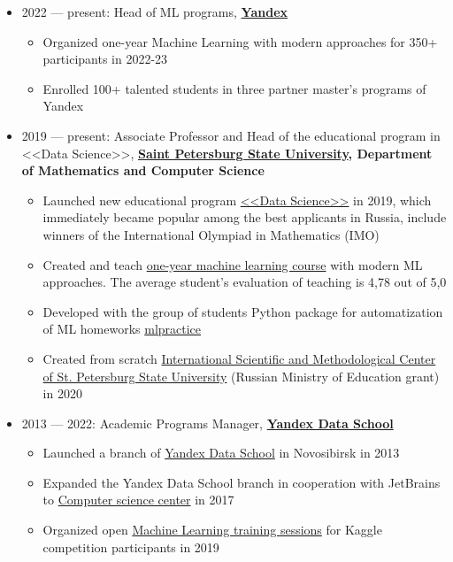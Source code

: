 \documentclass[11pt]{article}
\begin{document}
\begin{itemize}
	\item 2022 — present:
	Head of ML programs, \textbf{\href{https://yandex.ru}{Yandex}}
	\begin{itemize}
		\item Organized one-year Machine Learning with modern approaches for 350+ participants in 2022-23
		\item Enrolled 100+ talented students in three partner master's programs of Yandex 
	\end{itemize}

 \item 2019 — present:
 Associate Professor and Head of the educational program in <<Data Science>>,  \textbf{\href{https://spbu.ru}{Saint Petersburg State University}, Department of Mathematics and Computer Science}
 \begin{itemize}
	 \item Launched new educational program \href{https://maad.compscicenter.ru}{<<Data Science>>} in 2019, which immediately became popular among the best applicants in Russia, include winners of the International Olympiad in Mathematics (IMO)
	 \item Created and teach \href{https://github.com/spbu-math-cs/ml-course/}{one-year machine learning course} with modern ML approaches. The average student's evaluation of teaching is 4,78 out of 5,0
	 \item Developed with the group of students Python package for automatization of ML homeworks \href{https://github.com/avalur/mlpractice}{mlpractice}
	 \item Created from scratch \href{https://gsom.spbu.ru/all_news/event2021-02-04/}{International Scientific and Methodological Center of St. Petersburg State University} (Russian Ministry of Education grant) in 2020
 \end{itemize}

  \item 2013 — 2022:
	Academic Programs Manager, \textbf{\href{https://yandexdataschool.ru}{Yandex Data School}}
	\begin{itemize}
		\item Launched a branch of \href{https://yandexdataschool.ru}{Yandex Data School} in Novosibirsk in 2013
		\item Expanded the Yandex Data School branch in cooperation with JetBrains to \href{https://compscicenter.ru}{Computer science center} in 2017
		\item Organized open \href{https://habr.com/ru/company/JetBrains-education/blog/458042/}{Machine Learning training sessions} for Kaggle competition participants in 2019
	\end{itemize}


\end{itemize}
\end{document}
